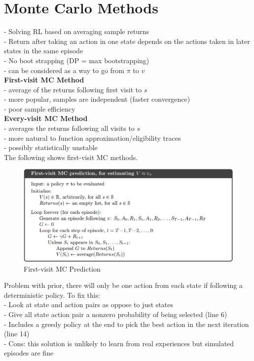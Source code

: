\documentclass{article}
\begin{document}
\newpage
\noindent
\section{Monte Carlo Methods}
- Solving RL based on averaging sample returns\\
- Return after taking an action in one state depends on the actions taken in
later states in the same episode\\
- No boot strapping (DP = max bootstrapping)\\
- can be considered as a way to go from $\pi$ to $v$\\

\noindent
\textbf{First-visit MC Method}\\
- average of the returns following first visit to $s$\\
- more popular, samples are independent (faster convergence)\\
- poor sample efficiency\\

\noindent
\textbf{Every-visit MC Method}\\
- averages the returns following all visits to $s$\\
- more natural to function approximation/eligibility traces\\
- possibly statistically unstable\\

\noindent
The following shows first-visit MC methods.

\begin{figure}[h]
\includegraphics[scale=0.25]{firstvisit_mc}
\centering
\caption{First-visit MC Prediction}
\end{figure}

\noindent
Problem with prior, there will only be one action from each state if following
a deterministic policy. To fix this: \\
- Look at state and action pairs as oppose to just states\\
- Give all state action pair a nonzero probability of being selected (line 6)\\
- Includes a greedy policy at the end to pick the best action in the next
iteration (line 14)\\
- Cons: this solution is unlikely to learn from real experiences but simulated
episodes are fine\\
\end{document}
